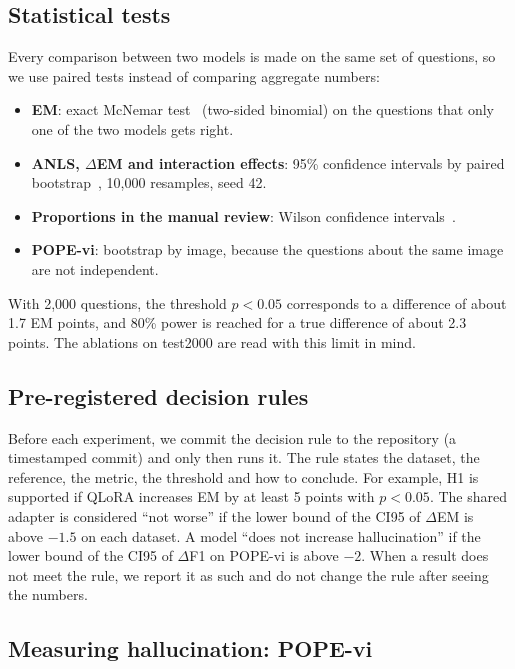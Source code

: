 \subsection{Statistical tests}
\label{sec:met-stats}

Every comparison between two models is made on the same set of questions, so we
use paired tests instead of comparing aggregate numbers:

\begin{itemize}
  \item \textbf{EM}: exact McNemar test~\cite{mcnemar1947} (two-sided binomial) on the
  questions that only one of the two models gets right.
  \item \textbf{ANLS, $\Delta$EM and interaction effects}: 95\% confidence intervals by
  paired bootstrap~\cite{efron1993}, 10,000 resamples, seed 42.
  \item \textbf{Proportions in the manual review}: Wilson confidence
  intervals~\cite{wilson1927}.
  \item \textbf{POPE-vi}: bootstrap by image, because the questions about the same image
  are not independent.
\end{itemize}

With 2,000 questions, the threshold $p < 0.05$ corresponds to a difference of about 1.7
EM points, and 80\% power is reached for a true difference of about 2.3 points. The
ablations on test2000 are read with this limit in mind.

\subsection{Pre-registered decision rules}

Before each experiment, we commit the decision rule to the repository (a
timestamped commit) and only then runs it. The rule states the dataset, the reference, the
metric, the threshold and how to conclude. For example, H1 is supported if QLoRA increases
EM by at least 5 points with $p < 0.05$. The shared adapter is considered ``not worse'' if
the lower bound of the CI95 of $\Delta$EM is above $-1.5$ on each dataset. A model ``does
not increase hallucination'' if the lower bound of the CI95 of $\Delta$F1 on POPE-vi is
above $-2$. When a result does not meet the rule, we report it as such and do not
change the rule after seeing the numbers.

\subsection{Measuring hallucination: POPE-vi}
\label{sec:met-pope}

